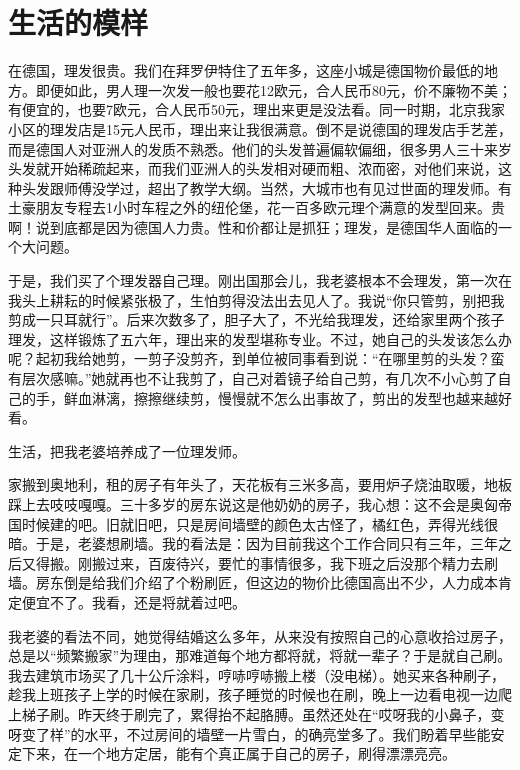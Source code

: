 \documentclass[twoside,openright,headings=optiontohead]{ctexbook} %
\begin{document}
{\chapter*{生活的模样}\label{Ordinary-world}

在德国，理发很贵。我们在拜罗伊特住了五年多，这座小城是德国物价最低的地方。即便如此，男人理一次发一般也要花12欧元，合人民币80元，价不廉物不美；有便宜的，也要7欧元，合人民币50元，理出来更是没法看。同一时期，北京我家小区的理发店是15元人民币，理出来让我很满意。倒不是说德国的理发店手艺差，而是德国人对亚洲人的发质不熟悉。他们的头发普遍偏软偏细，很多男人三十来岁头发就开始稀疏起来，而我们亚洲人的头发相对硬而粗、浓而密，对他们来说，这种头发跟师傅没学过，超出了教学大纲。当然，大城市也有见过世面的理发师。有土豪朋友专程去1小时车程之外的纽伦堡，花一百多欧元理个满意的发型回来。贵啊！说到底都是因为德国人力贵。性和价都让是抓狂；理发，是德国华人面临的一个大问题。

于是，我们买了个理发器自己理。刚出国那会儿，我老婆根本不会理发，第一次在我头上耕耘的时候紧张极了，生怕剪得没法出去见人了。我说``你只管剪，别把我剪成一只耳就行''。后来次数多了，胆子大了，不光给我理发，还给家里两个孩子理发，这样锻炼了五六年，理出来的发型堪称专业。不过，她自己的头发该怎么办呢？起初我给她剪，一剪子没剪齐，到单位被同事看到说：``在哪里剪的头发？蛮有层次感嘛。''她就再也不让我剪了，自己对着镜子给自己剪，有几次不小心剪了自己的手，鲜血淋漓，擦擦继续剪，慢慢就不怎么出事故了，剪出的发型也越来越好看。

生活，把我老婆培养成了一位理发师。

家搬到奥地利，租的房子有年头了，天花板有三米多高，要用炉子烧油取暖，地板踩上去吱吱嘎嘎。三十多岁的房东说这是他奶奶的房子，我心想：这不会是奥匈帝国时候建的吧。旧就旧吧，只是房间墙壁的颜色太古怪了，橘红色，弄得光线很暗。于是，老婆想刷墙。我的看法是：因为目前我这个工作合同只有三年，三年之后又得搬。刚搬过来，百废待兴，要忙的事情很多，我下班之后没那个精力去刷墙。房东倒是给我们介绍了个粉刷匠，但这边的物价比德国高出不少，人力成本肯定便宜不了。我看，还是将就着过吧。

我老婆的看法不同，她觉得结婚这么多年，从来没有按照自己的心意收拾过房子，总是以``频繁搬家''为理由，那难道每个地方都将就，将就一辈子？于是就自己刷。我去建筑市场买了几十公斤涂料，哼哧哼哧搬上楼（没电梯）。她买来各种刷子，趁我上班孩子上学的时候在家刷，孩子睡觉的时候也在刷，晚上一边看电视一边爬上梯子刷。昨天终于刷完了，累得抬不起胳膊。虽然还处在``哎呀我的小鼻子，变呀变了样''的水平，不过房间的墙壁一片雪白，的确亮堂多了。我们盼着早些能安定下来，在一个地方定居，能有个真正属于自己的房子，刷得漂漂亮亮。

}
\end{document}
